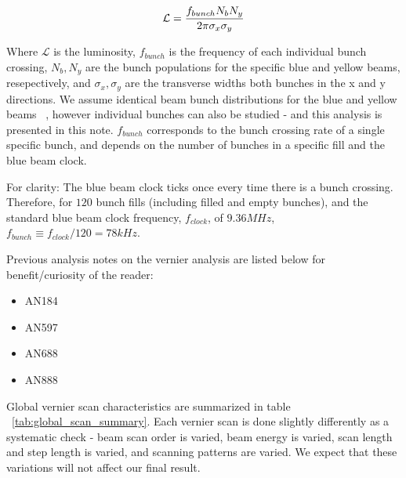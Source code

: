 \begin{equation} 
\label{eq:lumi_one_bunch} 
\mathcal{L} = {f_{bunch}N_{b} N_{y}\over{2\pi\sigma_{x}\sigma_{y}}} 
\end{equation}

Where $\mathcal{L}$ is the luminosity, $f_{bunch}$ is the frequency of each
individual bunch crossing, $N_{b}, N_{y}$ are the bunch populations for the
specific blue and yellow beams, resepectively, and $\sigma_{x}, \sigma_{y}$ are
the transverse widths both bunches in the x and y directions. We assume
identical beam bunch distributions for the blue and yellow beams
~\cite{AN888Datta2010}, however individual bunches can also be studied - and
this analysis is presented in this note. $f_{bunch}$ corresponds to the bunch
crossing rate of a single specific bunch, and depends on the number of bunches
in a specific fill and the blue beam clock.

For clarity: The blue beam clock ticks once every time there is a bunch
crossing.  Therefore, for $120$ bunch fills (including filled and empty
bunches), and the standard blue beam clock frequency, $f_{clock}$, of $9.36
MHz$, $f_{bunch} \equiv f_{clock} / 120 = 78 kHz$.

Previous analysis notes on the vernier analysis are listed below for
benefit/curiosity of the reader:

\begin{itemize}
\item AN184~\cite{AN184Belikov2003}
\item AN597~\cite{an597Bazilevsky2007}
\item AN688~\cite{an688Bennet2008}
\item AN888~\cite{AN888Datta2010}
\end{itemize}

Global vernier scan characteristics are summarized in table
~\ref{tab:global_scan_summary}. Each vernier scan is done slightly differently
as a systematic check - beam scan order is varied, beam energy is varied, scan
length and step length is varied, and scanning patterns are varied. We expect
that these variations will not affect our final result.




\setcounter{page}{1}

\clearpage

\resetlinenumber

\clearpage

\resetlinenumber

\tableofcontents

\clearpage

\resetlinenumber
